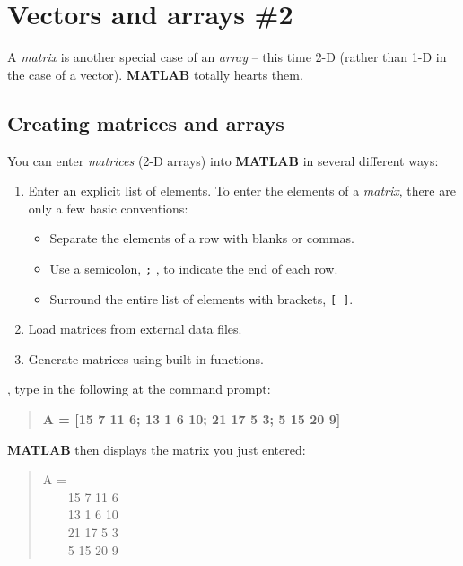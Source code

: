 \documentclass{tufte-book} %
\newenvironment{docspec}{\begin{quotation}\ttfamily\parskip0pt\parindent0pt\ignorespaces}{\end{quotation}}
\begin{document}

\section{Vectors and arrays \#2}

A \textit{matrix} is another special case of an \textit{array} -- this time 2-D (rather than 1-D in the case of a vector). \textbf{MATLAB} totally hearts them.
 
\subsection{Creating matrices and arrays}

You can enter \textit{matrices} (2-D arrays) into \textbf{MATLAB} in several different ways:

\begin{enumerate}[noitemsep]
\setlength{\itemindent}{.2in}
\item Enter an explicit list of elements.
To enter the elements of a \textit{matrix}, there are only a few basic conventions:
\begin{itemize}[noitemsep]
\setlength{\itemindent}{.4in}
\item Separate the elements of a row with blanks or commas.
\item Use a semicolon, \texttt{;} , to indicate the end of each row.
\item Surround the entire list of elements with  brackets, \texttt{[ ]}.
\end{itemize}
\item Load matrices from external data files.
\item Generate matrices using built-in functions.
\end{enumerate}

, type in the following at the command prompt:
\begin{docspec}
\textbf{A = [15 7 11 6; 13 1 6 10; 21 17 5 3; 5 15 20 9]}
\end{docspec}
\noindent \textbf{MATLAB} then displays the matrix you just entered:
\begin{docspec}
A =\\
\ \ \ \ 15   7  11   6\\
\ \ \ \ 13   1   6  10\\
\ \ \ \ 21  17   5   3\\
\ \ \ \ 5   15  20   9
\end{docspec}
\end{document}
